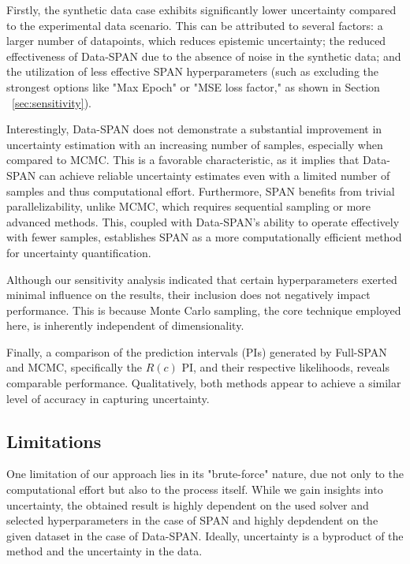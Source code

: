 Firstly, the synthetic data case exhibits significantly lower uncertainty compared to the experimental data scenario. This can be attributed to several factors: a larger number of datapoints, which reduces epistemic uncertainty; the reduced effectiveness of Data-SPAN due to the absence of noise in the synthetic data; and the utilization of less effective SPAN hyperparameters (such as excluding the strongest options like "Max Epoch" or "MSE loss factor," as shown in Section ~\vref{sec:sensitivity}).

Interestingly, Data-SPAN does not demonstrate a substantial improvement in uncertainty estimation with an increasing number of samples, especially when compared to MCMC. This is a favorable characteristic, as it implies that Data-SPAN can achieve reliable uncertainty estimates even with a limited number of samples and thus computational effort. Furthermore, SPAN benefits from trivial parallelizability, unlike MCMC, which requires sequential sampling or more advanced methods. This, coupled with Data-SPAN's ability to operate effectively with fewer samples, establishes SPAN as a more computationally efficient method for uncertainty quantification.

Although our sensitivity analysis indicated that certain hyperparameters exerted minimal influence on the results, their inclusion does not negatively impact performance. This is because Monte Carlo sampling, the core technique employed here, is inherently independent of dimensionality.

Finally, a comparison of the prediction intervals (PIs) generated by Full-SPAN and MCMC, specifically the $R(c)$ PI, and their respective likelihoods, reveals comparable performance. Qualitatively, both methods appear to achieve a similar level of accuracy in capturing uncertainty.




\subsection{Limitations}
One limitation of our approach lies in its "brute-force" nature, due not only to the computational effort but also to the process itself. While we gain insights into uncertainty, the obtained result is highly dependent on the used solver and selected hyperparameters in the case of SPAN and highly depdendent on the given dataset in the case of Data-SPAN. Ideally, uncertainty is a byproduct of the method and the uncertainty in the data.

